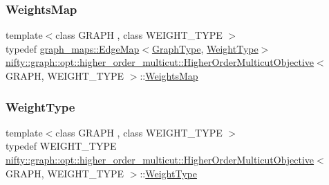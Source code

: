 \subsubsection{\texorpdfstring{Weights\+Map}{WeightsMap}}
{\footnotesize\ttfamily template$<$class G\+R\+A\+PH , class W\+E\+I\+G\+H\+T\+\_\+\+T\+Y\+PE $>$ \\
typedef \hyperlink{structnifty_1_1graph_1_1graph__maps_1_1EdgeMap}{graph\+\_\+maps\+::\+Edge\+Map}$<$\hyperlink{classnifty_1_1graph_1_1opt_1_1higher__order__multicut_1_1HigherOrderMulticutObjective_a177204e42faa461d572976de69fbf3b9}{Graph\+Type}, \hyperlink{classnifty_1_1graph_1_1opt_1_1higher__order__multicut_1_1HigherOrderMulticutObjective_ac36de4a6a975540630cb89af6d5d83b2}{Weight\+Type}$>$ \hyperlink{classnifty_1_1graph_1_1opt_1_1higher__order__multicut_1_1HigherOrderMulticutObjective}{nifty\+::graph\+::opt\+::higher\+\_\+order\+\_\+multicut\+::\+Higher\+Order\+Multicut\+Objective}$<$ G\+R\+A\+PH, W\+E\+I\+G\+H\+T\+\_\+\+T\+Y\+PE $>$\+::\hyperlink{classnifty_1_1graph_1_1opt_1_1higher__order__multicut_1_1HigherOrderMulticutObjective_ae3dca1bc16e023da893b0a69d01d6382}{Weights\+Map}}

\mbox{\label{classnifty_1_1graph_1_1opt_1_1higher__order__multicut_1_1HigherOrderMulticutObjective_ac36de4a6a975540630cb89af6d5d83b2}} 
\subsubsection{\texorpdfstring{Weight\+Type}{WeightType}}
{\footnotesize\ttfamily template$<$class G\+R\+A\+PH , class W\+E\+I\+G\+H\+T\+\_\+\+T\+Y\+PE $>$ \\
typedef W\+E\+I\+G\+H\+T\+\_\+\+T\+Y\+PE \hyperlink{classnifty_1_1graph_1_1opt_1_1higher__order__multicut_1_1HigherOrderMulticutObjective}{nifty\+::graph\+::opt\+::higher\+\_\+order\+\_\+multicut\+::\+Higher\+Order\+Multicut\+Objective}$<$ G\+R\+A\+PH, W\+E\+I\+G\+H\+T\+\_\+\+T\+Y\+PE $>$\+::\hyperlink{classnifty_1_1graph_1_1opt_1_1higher__order__multicut_1_1HigherOrderMulticutObjective_ac36de4a6a975540630cb89af6d5d83b2}{Weight\+Type}}



